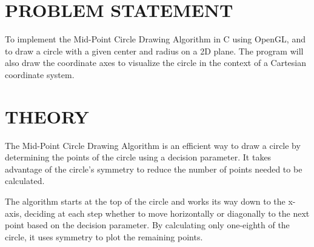 \documentclass{article}
\begin{document}
\section*{PROBLEM STATEMENT}
To implement the Mid-Point Circle Drawing Algorithm in C using OpenGL, and to draw a circle with a given center and radius on a 2D plane. The program will also draw the coordinate axes to visualize the circle in the context of a Cartesian coordinate system.

\section*{THEORY}
The Mid-Point Circle Drawing Algorithm is an efficient way to draw a circle by determining the points of the circle using a decision parameter. It takes advantage of the circle's symmetry to reduce the number of points needed to be calculated. 

The algorithm starts at the top of the circle and works its way down to the x-axis, deciding at each step whether to move horizontally or diagonally to the next point based on the decision parameter. By calculating only one-eighth of the circle, it uses symmetry to plot the remaining points.
\end{document}
